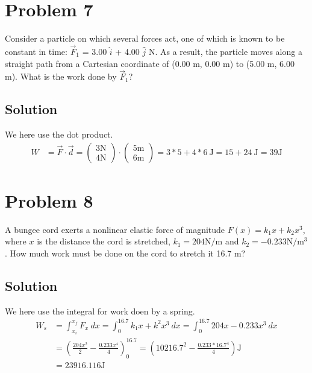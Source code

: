\documentclass[12pt]{article}
\begin{document}
\pagebreak
\section*{Problem 7}

Consider a particle on which several forces act, one of which is known to be constant in time: $\vec{F}_1$ = 3.00 $\hat{i}$ + 4.00 $\hat{j}$ N. As a result, the particle moves along a straight path from a Cartesian coordinate of (0.00 m, 0.00 m) to (5.00 m, 6.00 m). What is the work done by $\vec{F}_1$?

\subsection*{Solution}
We here use the dot product.
\begin{align*}
    W   &=  \vec{F} \cdot \vec{d}
        =   \begin{pmatrix} 3 \unit{\newton} \\ 4 \unit{\newton} \end{pmatrix} \cdot \begin{pmatrix} 5 \unit{\meter} \\ 6 \unit{\meter} \end{pmatrix}
        =   3 * 5 + 4 * 6 \ \unit{\joule}
        =   15 + 24 \ \unit{\joule} = \boxed{39 \unit{\joule}}
\end{align*}

\pagebreak
\section*{Problem 8}
A bungee cord exerts a nonlinear elastic force of magnitude $F(x) = k_1x + k_2 x^3$, where $x$ is the distance the cord is stretched, $k_1 = 204 \unit{\N/\m}$ and $k_2 = -0.233 \unit{\N/\m^3}$. How much work must be done on the cord to stretch
it 16.7 m?

\subsection*{Solution}
We here use the integral for work doen by a spring.
\begin{align*}
    W_s &=  \int_{x_i}^{x_f} F_x\ dx
        =   \int_{0}^{16.7} k_1 x + k^2 x^3\ dx
        =   \int_{0}^{16.7} 204x - 0.233x^3\ dx\\
        &=  \left(\frac{204x^2}{2} - \frac{0.233x^4}{4}\right)_0^{16.7}
        =   \left(102 16.7^2 - \frac{0.233*16.7^4}{4}\right) \unit{\joule}\\
        &=  \boxed{23916.116 \unit{\joule}}
\end{align*}
\end{document}
